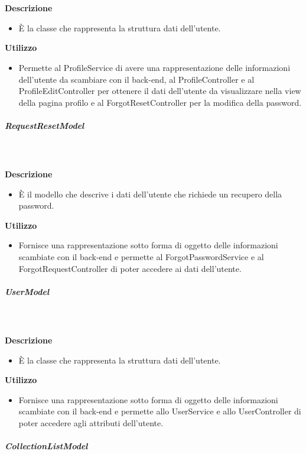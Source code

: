 				\textbf{\\ \\ Descrizione} 
					\begin{itemize}
						\item[] È la classe che rappresenta la struttura dati dell'utente.
					\end{itemize}      
				\textbf{Utilizzo}  
					\begin{itemize}
						\item[] Permette al ProfileService di avere una rappresentazione delle informazioni dell'utente da scambiare con il back-end, al ProfileController e al ProfileEditController per ottenere il dati dell'utente da visualizzare nella view della pagina profilo e al ForgotResetController per la modifica della password.
					\end{itemize}
			\subparagraph{RequestResetModel}
				
				\textbf{\\ \\ Descrizione} 
					\begin{itemize}
						\item[] È il modello che descrive i dati dell'utente che richiede un recupero della password.
					\end{itemize}      
				\textbf{Utilizzo}  
					\begin{itemize}
						\item[] Fornisce una rappresentazione sotto forma di oggetto delle informazioni scambiate con il back-end e permette al ForgotPasswordService e al ForgotRequestController di poter accedere ai dati dell'utente.
					\end{itemize}
			\subparagraph{UserModel}
				
				\textbf{\\ \\ Descrizione} 
					\begin{itemize}
						\item[] È la classe che rappresenta la struttura dati dell'utente.
					\end{itemize}      
				\textbf{Utilizzo}  
					\begin{itemize}
						\item[] Fornisce una rappresentazione sotto forma di oggetto delle informazioni scambiate con il back-end e permette allo UserService e allo UserController di poter accedere agli attributi dell'utente.
					\end{itemize}
			\subparagraph{CollectionListModel}
				
